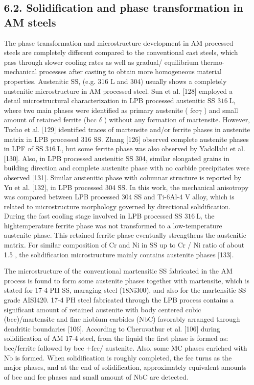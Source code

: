 \documentclass[10pt]{article}
\begin{document}
\subsection*{6.2. Solidification and phase transformation in AM steels}
The phase transformation and microstructure development in AM processed steels are completely different compared to the conventional cast steels, which pass through slower cooling rates as well as gradual/ equilibrium thermo-mechanical processes after casting to obtain more homogeneous material properties. Austenitic SS, (e.g. 316 L and 304) usually shows a completely austenitic microstructure in AM processed steel. Sun et al. [128] employed a detail microstructural characterization in LPB processed austenitic SS $316 \mathrm{~L}$, where two main phases were identified as primary austenite ( $\mathrm{fcc} \gamma$ ) and small amount of retained ferrite (bcc $\delta$ ) without any formation of martensite. However, Tucho et al. [129] identified traces of martensite and/or ferrite phases in austenite matrix in LPB processed 316 SS. Zhang [126] observed complete austenite phases in LPF of SS $316 \mathrm{~L}$, but some ferrite phase was also observed by Yadollahi et al. [130]. Also, in LPB processed austenitic SS 304, similar elongated grains in building direction and complete austenite phase with no carbide precipitates were observed [131]. Similar austenitic phase with columnar structure is reported by Yu et al. [132], in LPB processed 304 SS. In this work, the mechanical anisotropy was compared between LPB processed 304 SS and Ti-6Al-4 V alloy, which is related to microstructure morphology governed by directional solidification. During the fast cooling stage involved in LPB processed SS $316 \mathrm{~L}$, the hightemperature ferrite phase was not transformed to a low-temperature austenite phase. This retained ferrite phase eventually strengthens the austenitic matrix. For similar composition of $\mathrm{Cr}$ and $\mathrm{Ni}$ in $\mathrm{SS}$ up to $\mathrm{Cr}$ / Ni ratio of about 1.5 , the solidification microstructure mainly contains austenite phases [133].

The microstructure of the conventional martensitic SS fabricated in the AM process is found to form some austenite phases together with martensite, which is stated for 17-4 PH SS, maraging steel (18Ni300), and also for the martensitic SS grade AISI420. 17-4 PH steel fabricated through the LPB process contains a significant amount of retained austenite with body centered cubic (bcc)/martensite and fine niobium carbides (NbC) favorably arranged through dendritic boundaries [106]. According to Cheruvathur et al. [106] during solidification of AM 17-4 steel, from the liquid the first phase is formed as: bcc/ferrite followed by bcc $+\mathrm{fcc} /$ austenite. Also, some MC phases enriched with $\mathrm{Nb}$ is formed. When solidification is roughly completed, the fcc turns as the major phases, and at the end of solidification, approximately equivalent amounts of bcc and fcc phases and small amount of NbC are detected.
\end{document}
